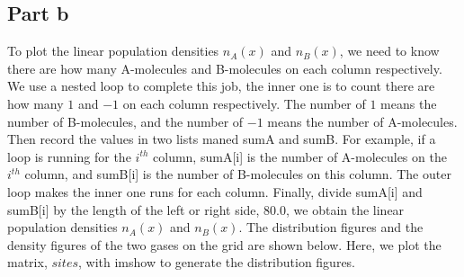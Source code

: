 \documentclass{article}
\begin{document}
\subsection{Part b}
\quad To plot the linear population densities $n_{A}(x)$ and $n_{B}(x)$, we need
to know there are how many A-molecules and B-molecules on each column
respectively. We use a nested loop to complete this job, the inner one is to
count there are how many $1$ and $-1$ on each column respectively. The
number of $1$ means the number of B-molecules, and the number of $-1$ means
the number of A-molecules. Then record the values in two lists maned sumA
and sumB. For example, if a loop is running for the $i^{th}$ column, sumA[i]
is the number of A-molecules on the $i^{th}$ column, and sumB[i] is the
number of B-molecules on this column. The outer loop makes the inner one
runs for each column. Finally, divide sumA[i] and sumB[i] by the length of
the left or right side, $80.0$, we obtain the linear population densities $%
n_{A}(x)$ and $n_{B}(x)$. The distribution figures and the density figures
of the two gases on the grid are shown below. Here, we plot the matrix, $%
sites$, with imshow to generate the distribution figures.
\begin{figure}[!ht]
	\centering
\end{figure}
\end{document}
